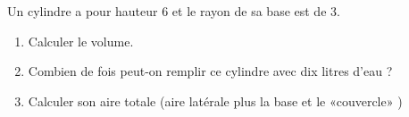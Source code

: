 
\begin{exercice}\label{exosmath-0009}

    Un cylindre a pour hauteur \unit{6}{\centi\meter} et le rayon de sa base est de \unit{3}{\centi\meter}.
    \begin{enumerate}
        \item
            Calculer le volume.
        \item
            Combien de fois peut-on remplir ce cylindre avec dix litres d'eau ?
        \item
            Calculer son aire totale (aire latérale plus la base et le «couvercle» )
    \end{enumerate}

\end{exercice}
